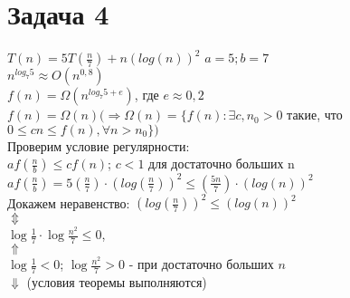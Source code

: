 \documentclass[12pt]{article}
\begin{document}
	\section*{Задача 4}
	$T(n) = 5T(\frac{n}{7}) + n{(log(n))}^2$
	$a = 5; b = 7$ \\
	${n}^{log_{7}{5}} \approx O({n}^{0,8})$\\
	$f(n) = \Omega({n}^{log_{7}{5} + e})$, где $e \approx 0,2$\\
	$f(n) = \Omega(n) (\Rightarrow \Omega(n) = \{f(n): \exists c, n_{0} > 0$ такие, что $0 \leq cn \leq f(n), \forall n > n_{0}\})$\\
	Проверим условие регулярности:\\
	$af(\frac{n}{b}) \leq cf(n)$; $c < 1$ для достаточно больших n \\
	$af(\frac{n}{b}) = 5(\frac{n}{7})\cdot{(log(\frac{n}{7}))}^2 \leq (\frac{5n}{7})\cdot({log(n)})^2$ \\
	Докажем неравенство: ${(log(\frac{n}{7}))}^2 \leq {(log(n))}^2$ \\ 
	$\Updownarrow$\\
	$\log{\frac{1}{7}}\cdot\log{\frac{{n}^2}{7}} \leq 0$, \\ 
	$\Uparrow$ \\
	$\log{\frac{1}{7}} < 0$; $\log{\frac{{n}^2}{7}} > 0$ - при достаточно больших $n$	\\
	$\Downarrow$ (условия теоремы выполняются) \\
	 \\
\end{document}
